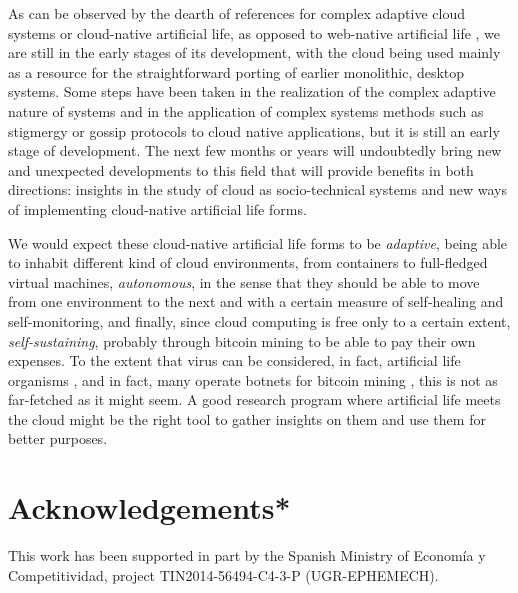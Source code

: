 \documentclass[utf8]{frontiersSCNS} %
\begin{document}
As can be observed by the dearth of references for complex adaptive cloud
systems or cloud-native artificial life, as opposed to web-native
artificial life \citep{taylor2016webal}, we are still in the early
stages of its development, with the cloud being used mainly as a
resource for the straightforward porting of earlier monolithic, desktop systems. Some
steps have been taken in the realization of the complex adaptive
nature of systems and in the application of complex systems methods
such as stigmergy or gossip protocols to cloud native applications,
but it is still an early stage of development. The next few months or
years will undoubtedly bring new and unexpected developments to this
field that will provide benefits in both directions: insights in the
study of cloud as socio-technical systems and new ways of implementing
cloud-native artificial life forms.

We would expect these cloud-native artificial life forms to be {\em
  adaptive}, being able to inhabit different kind of cloud
environments, from containers to full-fledged virtual machines, {\em
  autonomous}, in the sense that they should be able to move from one
environment to the next and with a certain measure of self-healing and
self-monitoring, and finally, since cloud computing is free only to a
certain extent, {\em self-sustaining}, probably through bitcoin mining to be
able to pay their own expenses. To the extent that virus can be
considered, in fact, artificial life organisms
\citep{doi:10.1162/artl.1994.1.3.249}, and in fact, many operate
botnets for bitcoin mining \citep{plohmann2012case}, this is not as
far-fetched as it might seem. A good research program where artificial
life meets the cloud might be the right tool to gather insights on
them and use them for better purposes. 

\section{Acknowledgements*}

This work has been supported in part by the Spanish Ministry of Economía y Competitividad, project TIN2014-56494-C4-3-P (UGR-EPHEMECH).



\end{document}
